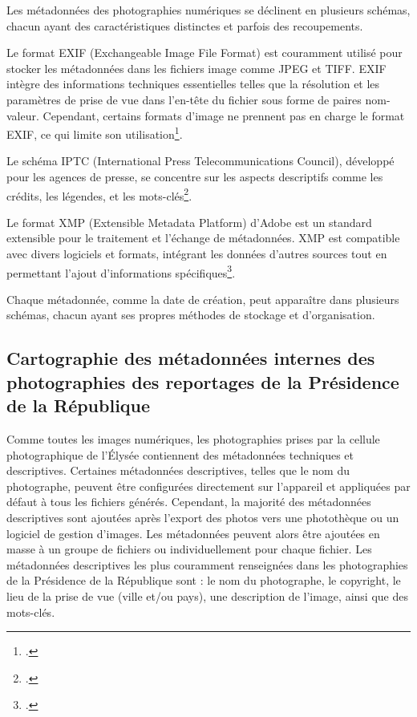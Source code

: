 Les métadonnées des photographies numériques se déclinent en plusieurs schémas, chacun ayant des caractéristiques distinctes et parfois des recoupements.

Le format EXIF (Exchangeable Image File Format) est couramment utilisé pour stocker les métadonnées dans les fichiers image comme JPEG et TIFF. EXIF intègre des informations techniques essentielles telles que la résolution et les paramètres de prise de vue dans l’en-tête du fichier sous forme de paires nom-valeur. Cependant, certains formats d'image ne prennent pas en charge le format EXIF, ce qui limite son utilisation\footcite[][pp.9-16]{chirolletPenserPhotographieNumerique2015}.

Le schéma IPTC (International Press Telecommunications Council), développé pour les agences de presse, se concentre sur les aspects descriptifs comme les crédits, les légendes, et les mots-clés\footcite{PresentationConceptsMetadonnees}.

Le format XMP (Extensible Metadata Platform) d’Adobe est un standard extensible pour le traitement et l’échange de métadonnées. XMP est compatible avec divers logiciels et formats, intégrant les données d'autres sources tout en permettant l’ajout d'informations spécifiques\footcite{PresentationConceptsMetadonnees}.

Chaque métadonnée, comme la date de création, peut apparaître dans plusieurs schémas, chacun ayant ses propres méthodes de stockage et d'organisation.

\subsection*{Cartographie des métadonnées internes des photographies des reportages de la Présidence de la République}

Comme toutes les images numériques, les photographies prises par la cellule photographique de l'Élysée contiennent des métadonnées techniques et descriptives. Certaines métadonnées descriptives, telles que le nom du photographe, peuvent être configurées directement sur l'appareil et appliquées par défaut à tous les fichiers générés. Cependant, la majorité des métadonnées descriptives sont ajoutées après l'export des photos vers une photothèque ou un logiciel de gestion d'images. Les métadonnées peuvent alors être ajoutées en masse à un groupe de fichiers ou individuellement pour chaque fichier. Les métadonnées descriptives les plus couramment renseignées dans les photographies de la Présidence de la République sont : le nom du photographe, le copyright, le lieu de la prise de vue (ville et/ou pays), une description de l'image, ainsi que des mots-clés.


